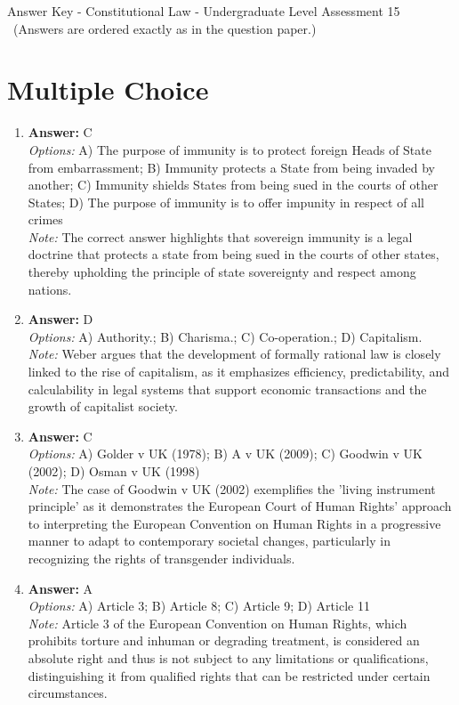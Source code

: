\documentclass[12pt]{article}
\begin{document}
\begin{center}
Answer Key - Constitutional Law - Undergraduate Level Assessment 15 \
\small (Answers are ordered exactly as in the question paper.)
\end{center}

\section*{Multiple Choice}
\begin{enumerate}[label=\arabic*.]
\item \textbf{Answer:} C
\\ \textit{Options:} A) The purpose of immunity is to protect foreign Heads of State from embarrassment; B) Immunity protects a State from being invaded by another; C) Immunity shields States from being sued in the courts of other States; D) The purpose of immunity is to offer impunity in respect of all crimes
\\ \textit{Note:} The correct answer highlights that sovereign immunity is a legal doctrine that protects a state from being sued in the courts of other states, thereby upholding the principle of state sovereignty and respect among nations.
\item \textbf{Answer:} D
\\ \textit{Options:} A) Authority.; B) Charisma.; C) Co-operation.; D) Capitalism.
\\ \textit{Note:} Weber argues that the development of formally rational law is closely linked to the rise of capitalism, as it emphasizes efficiency, predictability, and calculability in legal systems that support economic transactions and the growth of capitalist society.
\item \textbf{Answer:} C
\\ \textit{Options:} A) Golder v UK (1978); B) A v UK (2009); C) Goodwin v UK (2002); D) Osman v UK (1998)
\\ \textit{Note:} The case of Goodwin v UK (2002) exemplifies the 'living instrument principle' as it demonstrates the European Court of Human Rights' approach to interpreting the European Convention on Human Rights in a progressive manner to adapt to contemporary societal changes, particularly in recognizing the rights of transgender individuals.
\item \textbf{Answer:} A
\\ \textit{Options:} A) Article 3; B) Article 8; C) Article 9; D) Article 11
\\ \textit{Note:} Article 3 of the European Convention on Human Rights, which prohibits torture and inhuman or degrading treatment, is considered an absolute right and thus is not subject to any limitations or qualifications, distinguishing it from qualified rights that can be restricted under certain circumstances.

\end{enumerate}
\end{document}
